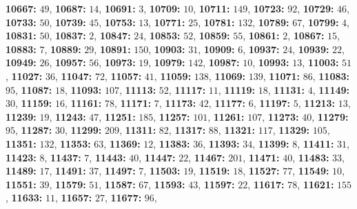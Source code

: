 \textsf{\bfseries 10667:} $49$, \textsf{\bfseries 10687:} $14$, \textsf{\bfseries 10691:} $3$, \textsf{\bfseries 10709:} $10$, \textsf{\bfseries 10711:} $149$, \textsf{\bfseries 10723:} $92$, \textsf{\bfseries 10729:} $46$, \textsf{\bfseries 10733:} $50$, \textsf{\bfseries 10739:} $45$, \textsf{\bfseries 10753:} $13$, \textsf{\bfseries 10771:} $25$, \textsf{\bfseries 10781:} $132$, \textsf{\bfseries 10789:} $67$, \textsf{\bfseries 10799:} $4$, \textsf{\bfseries 10831:} $50$, \textsf{\bfseries 10837:} $2$, \textsf{\bfseries 10847:} $24$, \textsf{\bfseries 10853:} $52$, \textsf{\bfseries 10859:} $55$, \textsf{\bfseries 10861:} $2$, \textsf{\bfseries 10867:} $15$, \textsf{\bfseries 10883:} $7$, \textsf{\bfseries 10889:} $29$, \textsf{\bfseries 10891:} $150$, \textsf{\bfseries 10903:} $31$, \textsf{\bfseries 10909:} $6$, \textsf{\bfseries 10937:} $24$, \textsf{\bfseries 10939:} $22$, \textsf{\bfseries 10949:} $26$, \textsf{\bfseries 10957:} $56$, \textsf{\bfseries 10973:} $19$, \textsf{\bfseries 10979:} $142$, \textsf{\bfseries 10987:} $10$, \textsf{\bfseries 10993:} $13$, \textsf{\bfseries 11003:} $51$, \textsf{\bfseries 11027:} $36$, \textsf{\bfseries 11047:} $72$, \textsf{\bfseries 11057:} $41$, \textsf{\bfseries 11059:} $138$, \textsf{\bfseries 11069:} $139$, \textsf{\bfseries 11071:} $86$, \textsf{\bfseries 11083:} $95$, \textsf{\bfseries 11087:} $18$, \textsf{\bfseries 11093:} $107$, \textsf{\bfseries 11113:} $52$, \textsf{\bfseries 11117:} $11$, \textsf{\bfseries 11119:} $18$, \textsf{\bfseries 11131:} $4$, \textsf{\bfseries 11149:} $30$, \textsf{\bfseries 11159:} $16$, \textsf{\bfseries 11161:} $78$, \textsf{\bfseries 11171:} $7$, \textsf{\bfseries 11173:} $42$, \textsf{\bfseries 11177:} $6$, \textsf{\bfseries 11197:} $5$, \textsf{\bfseries 11213:} $13$, \textsf{\bfseries 11239:} $19$, \textsf{\bfseries 11243:} $47$, \textsf{\bfseries 11251:} $185$, \textsf{\bfseries 11257:} $101$, \textsf{\bfseries 11261:} $107$, \textsf{\bfseries 11273:} $40$, \textsf{\bfseries 11279:} $95$, \textsf{\bfseries 11287:} $30$, \textsf{\bfseries 11299:} $209$, \textsf{\bfseries 11311:} $82$, \textsf{\bfseries 11317:} $88$, \textsf{\bfseries 11321:} $117$, \textsf{\bfseries 11329:} $105$, \textsf{\bfseries 11351:} $132$, \textsf{\bfseries 11353:} $63$, \textsf{\bfseries 11369:} $12$, \textsf{\bfseries 11383:} $36$, \textsf{\bfseries 11393:} $34$, \textsf{\bfseries 11399:} $8$, \textsf{\bfseries 11411:} $31$, \textsf{\bfseries 11423:} $8$, \textsf{\bfseries 11437:} $7$, \textsf{\bfseries 11443:} $40$, \textsf{\bfseries 11447:} $22$, \textsf{\bfseries 11467:} $201$, \textsf{\bfseries 11471:} $40$, \textsf{\bfseries 11483:} $33$, \textsf{\bfseries 11489:} $17$, \textsf{\bfseries 11491:} $37$, \textsf{\bfseries 11497:} $7$, \textsf{\bfseries 11503:} $19$, \textsf{\bfseries 11519:} $18$, \textsf{\bfseries 11527:} $77$, \textsf{\bfseries 11549:} $10$, \textsf{\bfseries 11551:} $39$, \textsf{\bfseries 11579:} $51$, \textsf{\bfseries 11587:} $67$, \textsf{\bfseries 11593:} $43$, \textsf{\bfseries 11597:} $22$, \textsf{\bfseries 11617:} $78$, \textsf{\bfseries 11621:} $155$, \textsf{\bfseries 11633:} $11$, \textsf{\bfseries 11657:} $27$, \textsf{\bfseries 11677:} $96$, 

